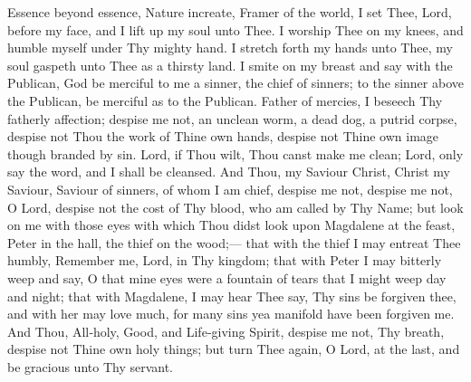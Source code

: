 Essence beyond essence,  Nature increate,  Framer of the world,  I set Thee, Lord, before my face,  and I lift up my soul unto Thee. I worship Thee on my knees,  and humble myself under Thy mighty hand. I stretch forth my hands unto Thee,  my soul gaspeth unto Thee as a thirsty land.  I smite on my breast  and say with the Publican,  God be merciful to me a sinner,  the chief of sinners;  to the sinner above the Publican,  be merciful as to the Publican.  Father of mercies,  I beseech Thy fatherly affection;  despise me not,  an unclean worm, a dead dog,  a putrid corpse,  despise not Thou the work of Thine own hands,  despise not Thine own image  though branded by sin.  Lord, if Thou wilt, Thou canst make me clean;  Lord, only say the word, and I shall be cleansed.  And Thou, my Saviour Christ,  Christ my Saviour,  Saviour of sinners, of whom I am chief,  despise me not,  despise me not, O Lord,  despise not the cost of Thy blood,  who am called by Thy Name;  but look on me with those eyes  with which Thou didst look upon  Magdalene at the feast,  Peter in the hall,  the thief on the wood;— that with the thief I may entreat Thee humbly,  Remember me, Lord, in Thy kingdom;  that with Peter I may bitterly weep and say,  O that mine eyes were a fountain of tears  that I might weep day and night;  that with Magdalene, I may hear Thee say,   Thy sins be forgiven thee,  and with her may love much,  for many sins yea manifold  have been forgiven me.  And Thou, All‑holy, Good, and  Life‑giving Spirit,  despise me not, Thy breath,  despise not Thine own holy things;  but turn Thee again, O Lord,  at the last,  and be gracious unto Thy servant.


